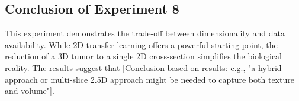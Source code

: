 \subsection{Conclusion of Experiment 8}
This experiment demonstrates the trade-off between dimensionality and data availability. While 2D transfer learning offers a powerful starting point, the reduction of a 3D tumor to a single 2D cross-section simplifies the biological reality. The results suggest that [Conclusion based on results: e.g., "a hybrid approach or multi-slice 2.5D approach might be needed to capture both texture and volume"].